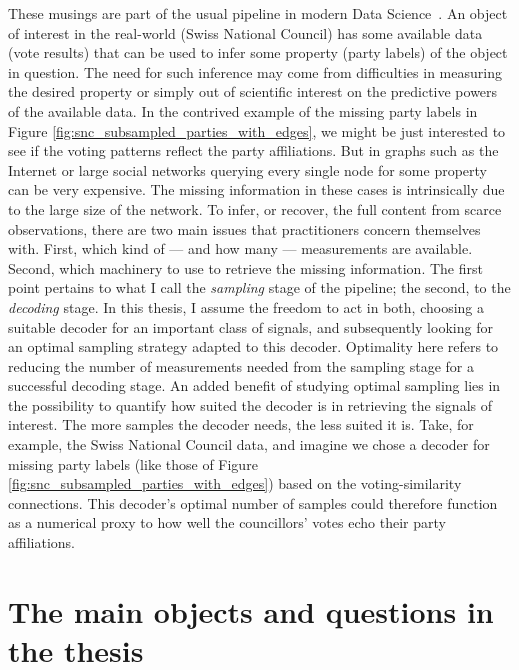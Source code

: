 These musings are part of the usual pipeline in modern Data Science~\cite{vanderaalst2016}. An object of interest in the real-world (Swiss National Council) has some available data (vote results) that can be used to infer some property (party labels) of the object in question. The need for such inference may come from difficulties in measuring the desired property or simply out of scientific interest on the predictive powers of the available data. In the contrived example of the missing party labels in Figure \ref{fig:snc_subsampled_parties_with_edges}, we might be just interested to see if the voting patterns reflect the party affiliations. But in graphs such as the Internet or large social networks querying every single node for some property can be very expensive. The missing information in these cases is intrinsically due to the large size of the network. To infer, or recover, the full content from scarce observations, there are two main issues that practitioners concern themselves with. First, which kind of --- and how many --- measurements are available. Second, which machinery to use to retrieve the missing information. The first point pertains to what I call the \emph{sampling} stage of the pipeline; the second, to the \emph{decoding} stage. In this thesis, I assume the freedom to act in both, choosing a suitable decoder for an important class of signals, and subsequently looking for an optimal sampling strategy adapted to this decoder. Optimality here refers to reducing the number of measurements needed from the sampling stage for a successful decoding stage. An added benefit of studying optimal sampling lies in the possibility to quantify how suited the decoder is in retrieving the signals of interest. The more samples the decoder needs, the less suited it is. Take, for example, the Swiss National Council data, and imagine we chose a decoder for missing party labels (like those of Figure \ref{fig:snc_subsampled_parties_with_edges}) based on the voting-similarity connections. This decoder's optimal number of samples could therefore function as a numerical proxy to how well the councillors' votes echo their party affiliations.


\section{The main objects and questions in the thesis}

